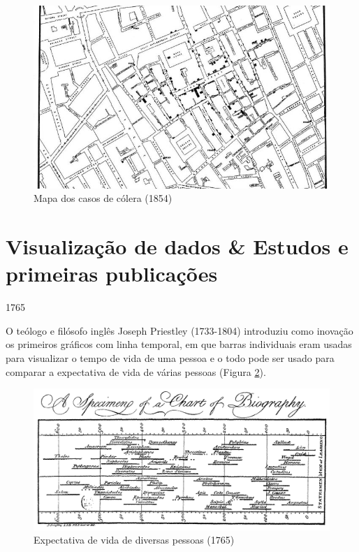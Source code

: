 \documentclass[
]{book}
\begin{document}
\begin{figure}

{\centering \includegraphics[width=0.75\linewidth]{images1/london-1854-snow} 

}

\caption{Mapa dos casos de cólera (1854)}\label{fig:figA8}
\end{figure}

\hypertarget{visualizauxe7uxe3o-de-dados-estudos-e-primeiras-publicauxe7uxf5es}{%
\section{Visualização de dados \& Estudos e primeiras publicações}\label{visualizauxe7uxe3o-de-dados-estudos-e-primeiras-publicauxe7uxf5es}}

1765

\hfill\break

O teólogo e filósofo inglês Joseph Priestley (1733-1804) introduziu como inovação os primeiros gráficos com linha temporal, em que barras individuais eram usadas para visualizar o tempo de vida de uma pessoa e o todo pode ser usado para comparar a expectativa de vida de várias pessoas (Figura \ref{fig:figA9}).

\hfill\break

\begin{figure}

{\centering \includegraphics[width=0.75\linewidth]{images1/priestley-timechart-1765} 

}

\caption{Expectativa de vida de diversas pessoas (1765)}\label{fig:figA9}
\end{figure}
\end{document}
